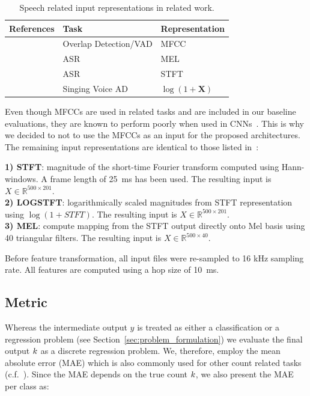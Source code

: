 \begin{table}
\caption{Speech related input representations in related work.}
\label{tab:inputrep}
  \centering
\begin{tabular}{rll}
\toprule
References & Task & Representation \\
\midrule
\cite{geiger13, hagerer17} & Overlap Detection/VAD & MFCC \\
\cite{Graves13, sainath15, marchi17} & ASR & MEL \\
\cite{amodei16} & ASR & STFT \\
\cite{schluter15, schluter16} & Singing Voice AD & \(\log(1 + \mathbf{X})\) \\
\bottomrule
\end{tabular}
\end{table}

Even though MFCCs are used in related tasks and are included in our baseline evaluations, they are known to perform poorly when used in CNNs~\cite{Seltzer13}.
This is why we decided to not to use the MFCCs as an input for the proposed architectures.
The remaining input representations are identical to those listed in~\cite{stoeter17}:

\noindent\textbf{1) STFT}: magnitude of the short-time Fourier transform computed using Hann-windows.
A frame length of 25~ms has been used.
The resulting input is \(X \in \mathbb{R}^{500 \times 201}\).\\
\textbf{2) LOGSTFT}: logarithmically scaled magnitudes from STFT representation using \(\log(1 + STFT)\).
The resulting input is \(X \in \mathbb{R}^{500 \times 201}\).\\
\textbf{3) MEL}: compute mapping from the STFT output directly onto Mel basis using 40 triangular filters.
The resulting input is \(X \in \mathbb{R}^{500 \times 40}\).
\par
Before feature transformation, all input files were re-sampled to 16 kHz sampling rate. All features are computed using a hop size of 10~ms.

\subsection{Metric}%
\label{ssec:metrics}

Whereas the intermediate output \(y\) is treated as either a classification or a regression problem (see Section~\ref{sec:problem_formulation}) we evaluate the final output \(k \) as a discrete regression problem.
We, therefore, employ the mean absolute error (MAE) which is also commonly used for other count related tasks (c.f.~\cite{zhang15, Rezatofigh16}).
Since the MAE depends on the true count \(k \), we also present the MAE per class as:

